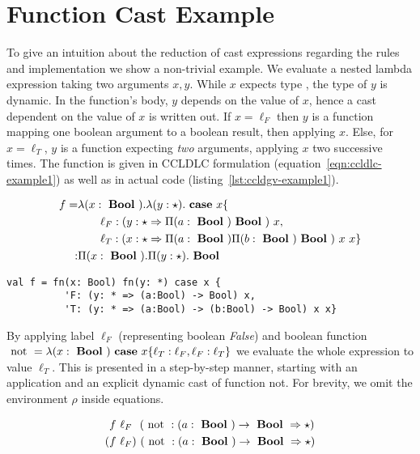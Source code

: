 \section{Function Cast Example}

To give an intuition about the reduction of cast expressions regarding the rules and implementation we show a non-trivial example. We evaluate a nested lambda expression taking two arguments $x,y$. While $x$ expects type \Bool, the type of $y$ is dynamic. In the function's body, $y$ depends on the value of $x$, hence a cast dependent on the value of $x$ is written out. If $x=\ell_F$ then $y$ is a function mapping one boolean argument to a boolean result, then applying $x$. Else, for $x=\ell_T$, $y$ is a function expecting \emph{two} arguments, applying $x$ two successive times. The function is given in CCLDLC formulation (equation~\ref{eqn:ccldlc-example1}) as well as in actual code (listing~\ref{lst:ccldgv-example1}).

\begin{equation}\label{eqn:ccldlc-example1}
\begin{split}
f = & \lambda (x: \text{ \textbf{Bool} })
. \lambda (y: \star )
. \text{ \textbf{case} } x \{ \\
& \qquad \ell_F: (y : \star \Rightarrow \Pi(a:\text{ \textbf{Bool} }) \text{ \textbf{Bool} })~x, \\
& \qquad \ell_T: (x : \star \Rightarrow \Pi(a:\text{ \textbf{Bool} }) \Pi(b:\text{ \textbf{Bool} }) \text{ \textbf{Bool} })~x~x \} \\
: & \Pi(x : \text{ \textbf{Bool} }) . \Pi (y: \star ) . \text{ \textbf{Bool} }
\end{split}
\end{equation}

\begin{lstlisting}[language=ldgv,
  label=lst:ccldgv-example1,
  caption=LDGV: CCLDGV example ``dependent function cast'']
val f = fn(x: Bool) fn(y: *) case x {
          'F: (y: * => (a:Bool) -> Bool) x,
          'T: (y: * => (a:Bool) -> (b:Bool) -> Bool) x x}
\end{lstlisting}

By applying label $\ell_F$ (representing boolean \emph{False}) and boolean function $\text{ not } = \lambda (x:\text{ \textbf{Bool} }) \text{ \textbf{case} } x \{ \ell_T: \ell_F, \ell_F: \ell_T\}$ we evaluate the whole expression to value $\ell_T$. This is presented in a step-by-step manner, starting with an application and an explicit dynamic cast of function not. For brevity, we omit the environment $\rho$ inside equations.

\begin{align}
& f~\ell_F~~(\text{ not } : (a:\text{ \textbf{Bool} }) \rightarrow \text{ \textbf{Bool} } \Rightarrow \star) \\
( & f~\ell_F)~(\text{ not } : (a:\text{ \textbf{Bool} }) \rightarrow \text{ \textbf{Bool} } \Rightarrow \star)
\end{align}

